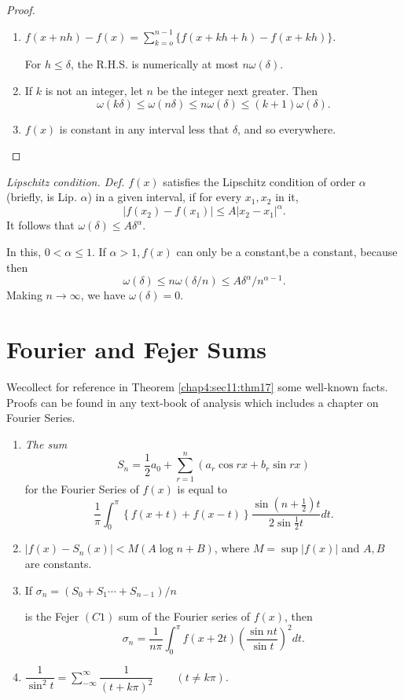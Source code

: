 \begin{proof}
  \begin{enumerate}[(1)]
  \item $f(x+nh) - f(x) = \sum \limits^{n-1}_{k=o} \bigg\{
    f(x+kh+h)-f(x+kh) \bigg \}$. 
    
    For $h \leq \delta$, the R.H.S. is numerically at most $n \omega(\delta)$.
  \item If $k$ is not an integer, let $n$ be the integer next greater. Then 
    $$
    \omega(k \delta) \leq \omega(n \delta) \leq n \omega(\delta) \leq
    (k+1) \omega(\delta). 
    $$
  \item $f(x)$ is constant in any interval less that $\delta$, and so
    everywhere.
  \end{enumerate}
\end{proof}

\textit{Lipschitz condition. Def. $f(x)$} satisfies the Lipschitz
condition of order $\alpha$(briefly, is Lip. $\alpha$) in a given
interval, if for every $x_1,x_2$ in it, 
$$
|f(x_2)-f(x_1)| \leq A|x_2 -x_1|^{\alpha}.
$$
It follows that $\omega (\delta) \leq A \delta^{\alpha}$.

In this, $0 < \alpha \leq 1$. If $\alpha >1, f(x)$ can only be a
constant,be a constant, because then  
$$
\omega (\delta)\leq n \omega (\delta/{n}) \leq A \delta^{\alpha}/n^{\alpha-1}.
$$
Making $n \to \infty$, we have $\omega (\delta) =0$.

\section{Fourier and Fejer Sums}\label{chap4:sec11}

We\pageoriginale collect for reference in Theorem \ref{chap4:sec11:thm17} some well-known facts. Proofs
can be found in any text-book of analysis which includes a chapter on
Fourier Series. 
\begin{theorem}\label{chap4:sec11:thm17} %
  \begin{enumerate}[\rm (1)]
  \item \textit{The sum}
    $$
    S_n = \frac{1}{2} a_0 + \sum^n_{r=1} (a_r \cos  rx + b_r \sin rx)
    $$
    for the Fourier Series of $f(x)$ is equal to 
    $$
    \frac{1}{\pi} \int^{\pi}_0 \left\{f(x+t) + f(x-t) \right\}
    \frac{\sin \left(n+ \frac{1}{2}\right)t}{2 \sin \frac{1}{2}t}dt. 
    $$
  \item $|f(x) - S_n (x) | < M (A \log n+ B)$, 
    where $M = \sup |f(x)|$ and $A,B$ are constants.
  \item If $\sigma_n = (S_0 + S_1 \cdots + S_{n-1})/n$
    
    is the Fejer $(C1)$ sum of the Fourier series of $f(x)$, then 
    $$
    \sigma_n = \frac{1}{n \pi} \int^{\pi}_0 f(x+ 2t) \left(\frac{\sin nt
   }{\sin t}\right)^2 dt. 
    $$
  \item $\dfrac{1}{\sin^2 t} = \sum^{\infty}_{-\infty} \dfrac{1}{(t +
    k \pi)^2} \qquad (t \neq k \pi).$ 
  \end{enumerate}
\end{theorem}

